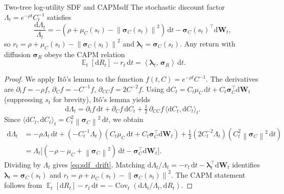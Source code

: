 ﻿\documentclass[11pt,letterpaper,oneside]{article}
\numberwithin{equation}{section}
\DeclareMathOperator{\E}{\mathbb{E}}
\DeclareMathOperator{\Cov}{\mathrm{Cov}}
\newcommand{\1}{\mathbf{1}}
\newcommand{\diff}{\mathrm{d}}
\newcommand{\norm}[1]{\left\lVert #1\right\rVert}
\newcommand{\ip}[2]{\left\langle #1,\,#2\right\rangle}
\begin{document}
\begin{proposition}{Two-tree log-utility SDF and CAPM}{sdf}
The stochastic discount factor $\Lambda_t=e^{-\rho t}C_t^{-1}$ satisfies
\begin{equation}\label{eq:sdf_drift}
  \frac{\diff \Lambda_t}{\Lambda_t}=-(\rho+\mu_C(s_t)-\norm{\bm{\sigma}_C(s_t)}^2)\,\diff t-\bm{\sigma}_C(s_t)^{\top}\diff \bm{W}_t,
\end{equation}
so $r_t=\rho+\mu_C(s_t)-\norm{\bm{\sigma}_C(s_t)}^2$ and $\bm{\lambda}_t=\bm{\sigma}_C(s_t)$. Any return with diffusion $\bm{\sigma}_R$ obeys the CAPM relation
\begin{equation}\label{eq:capm}
  \E_t[\diff R_t]-r_t\,\diff t=\ip{\bm{\lambda}_t}{\bm{\sigma}_R}\,\diff t.
\end{equation}
\end{proposition}
\begin{proof}
We apply It\^o's lemma to the function $f(t, C) = e^{-\rho t} C^{-1}$. The derivatives are $\partial_t f = -\rho f$, $\partial_C f = -C^{-1} f$, $\partial_{CC} f = 2C^{-2} f$. Using $\diff C_t = C_t\mu_C\,\diff t + C_t\bm{\sigma}_C^{\top}\diff\bm{W}_t$ (suppressing $s_t$ for brevity), It\^o's lemma yields
\[
  \diff\Lambda_t = \partial_t f\,\diff t + \partial_C f\,\diff C_t + \tfrac12\,\partial_{CC} f\,\langle\diff C_t,\diff C_t\rangle_t.
\]
Since $\langle\diff C_t,\diff C_t\rangle_t = C_t^2\norm{\bm{\sigma}_C}^2\,\diff t$, we obtain
\begin{align*}
  \diff\Lambda_t
  &= -\rho\Lambda_t\,\diff t + (-C_t^{-1}\Lambda_t)(C_t\mu_C\,\diff t + C_t\bm{\sigma}_C^{\top}\diff\bm{W}_t) + \tfrac12(2 C_t^{-2}\Lambda_t)(C_t^2\norm{\bm{\sigma}_C}^2\,\diff t) \\
  &= \Lambda_t\Big[(-\rho-\mu_C+\norm{\bm{\sigma}_C}^2)\,\diff t - \bm{\sigma}_C^{\top}\diff\bm{W}_t\Big].
\end{align*}
Dividing by $\Lambda_t$ gives \cref{eq:sdf_drift}. Matching $\diff\Lambda_t/\Lambda_t = -r_t\,\diff t - \bm{\lambda}_t^{\top}\diff\bm{W}_t$ identifies $\bm{\lambda}_t=\bm{\sigma}_C(s_t)$ and $r_t=\rho+\mu_C(s_t)-\norm{\bm{\sigma}_C(s_t)}^2$. The CAPM statement follows from $\E_t[\diff R_t]-r_t\,\diff t=-\Cov_t(\diff\Lambda_t/\Lambda_t,\diff R_t)$.
\end{proof}
\end{document}
